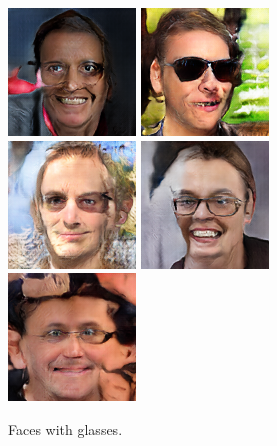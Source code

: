 \begin{figure}[!h]
\begin{subfigure}[b]{\textwidth}
{            \includegraphics[scale=0.485]{figures/ffhq/labeled-glasses-yes/ffhq128x128_image017.png}
            \includegraphics[scale=0.485]{figures/ffhq/labeled-glasses-yes/ffhq128x128_image020.png}
            \includegraphics[scale=0.485]{figures/ffhq/labeled-glasses-yes/ffhq128x128_image023.png}
            \includegraphics[scale=0.485]{figures/ffhq/labeled-glasses-yes/ffhq128x128_image029.png}
            \includegraphics[scale=0.485]{figures/ffhq/labeled-glasses-yes/ffhq128x128_image032.png}
        }
        \caption{Faces with glasses.}
        \vspace{0.1cm}
    \end{subfigure}
    \begin{subfigure}[b]{\textwidth}

\end{subfigure}
\end{figure}
